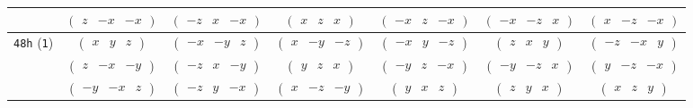 \documentclass[fleqn,9pt,landscape]{jsarticle}
\begin{document}
\begin{center}
\begin{longtable}{ccccccc}
& $ \begin{pmatrix} z & - x & - x \end{pmatrix} $ & $ \begin{pmatrix} - z & x & - x \end{pmatrix} $ & $ \begin{pmatrix} x & z & x \end{pmatrix} $ & $ \begin{pmatrix} - x & z & - x \end{pmatrix} $ & $ \begin{pmatrix} - x & - z & x \end{pmatrix} $ & $ \begin{pmatrix} x & - z & - x \end{pmatrix} $ \\ \hline
{\tt 48h} ({\tt 1}) & $ \begin{pmatrix} x & y & z \end{pmatrix} $ & $ \begin{pmatrix} - x & - y & z \end{pmatrix} $ & $ \begin{pmatrix} x & - y & - z \end{pmatrix} $ & $ \begin{pmatrix} - x & y & - z \end{pmatrix} $ & $ \begin{pmatrix} z & x & y \end{pmatrix} $ & $ \begin{pmatrix} - z & - x & y \end{pmatrix} $ \\
& $ \begin{pmatrix} z & - x & - y \end{pmatrix} $ & $ \begin{pmatrix} - z & x & - y \end{pmatrix} $ & $ \begin{pmatrix} y & z & x \end{pmatrix} $ & $ \begin{pmatrix} - y & z & - x \end{pmatrix} $ & $ \begin{pmatrix} - y & - z & x \end{pmatrix} $ & $ \begin{pmatrix} y & - z & - x \end{pmatrix} $ \\
& $ \begin{pmatrix} - y & - x & z \end{pmatrix} $ & $ \begin{pmatrix} - z & y & - x \end{pmatrix} $ & $ \begin{pmatrix} x & - z & - y \end{pmatrix} $ & $ \begin{pmatrix} y & x & z \end{pmatrix} $ & $ \begin{pmatrix} z & y & x \end{pmatrix} $ & $ \begin{pmatrix} x & z & y \end{pmatrix} $ \\

\end{longtable}
\end{center}
\end{document}
